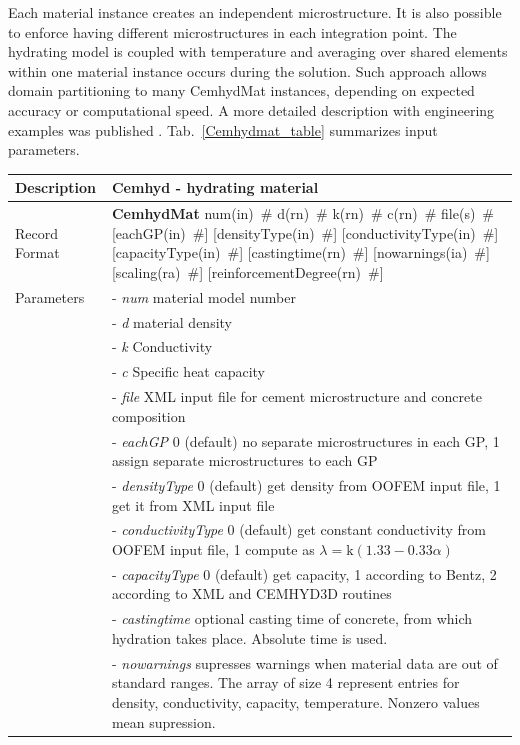 \documentclass[a4paper]{article}
\newcommand{\descitem}[1]{{\noindent \bf #1}}
\newcommand{\elemparam}[2]{{{#1\tiny (#2)}~\#}}
\newcommand{\param}[1]{{\it #1}}
\begin{document}
Each material instance creates an independent microstructure. It is also
possible to enforce having different microstructures in each integration point.
The hydrating model is coupled with temperature and averaging over shared
elements within one material instance occurs during the solution. Such approach
allows domain partitioning to many CemhydMat instances, depending on expected
accuracy or computational speed. A more detailed description with engineering
examples was published \cite{Smilauer:09}. Tab.~\ref{Cemhydmat_table} summarizes input parameters.

\begin{table}[!htb]
\begin{tabular}{|l|p{9cm}|}
\hline
Description & Cemhyd - hydrating material\\
\hline
Record Format & \descitem{CemhydMat} \elemparam{num}{in} \elemparam{d}{rn} \elemparam{k}{rn} \elemparam{c}{rn} \elemparam{file}{s} [\elemparam{eachGP}{in}] [\elemparam{densityType}{in}] [\elemparam{conductivityType}{in}] [\elemparam{capacityType}{in}] [\elemparam{castingtime}{rn}] [\elemparam{nowarnings}{ia}] [\elemparam{scaling}{ra}] [\elemparam{reinforcementDegree}{rn}]\\
Parameters &- \param{num} material model number\\
&- \param{d} material density\\
&- \param{k} Conductivity\\
&- \param{c} Specific heat capacity\\
&- \param{file} XML input file for cement microstructure and concrete composition\\
&- \param{eachGP} 0 (default) no separate microstructures in each GP, 1 assign separate microstructures to each GP\\
&- \param{densityType} 0 (default) get density from OOFEM input file, 1 get it from XML input file\\
&- \param{conductivityType} 0 (default) get constant conductivity from OOFEM input file, 1 compute as $\lambda = \textrm{k} (1.33-0.33\alpha)$ \cite{Ruiz:01}\\
&- \param{capacityType} 0 (default) get capacity, 1 according to Bentz, 2 according to XML and CEMHYD3D routines\\
&- \param{castingtime} optional casting time of concrete, from which hydration takes place. Absolute time is used.\\
&- \param{nowarnings} supresses warnings when material data are out of standard ranges. The array of size 4 represent entries for density, conductivity, capacity, temperature. Nonzero values mean supression.\\

\end{tabular}
\end{table}
\end{document}
